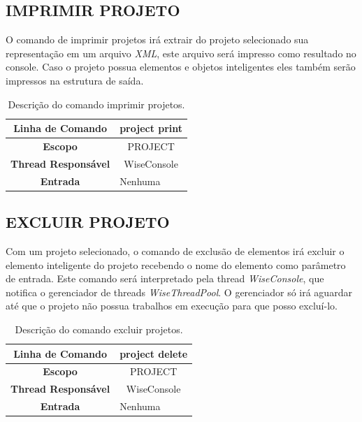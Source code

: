 \subsection{IMPRIMIR PROJETO}\label{sec:print_projects}

O comando de imprimir projetos irá extrair do projeto selecionado sua representação em um arquivo \textit{XML}, este arquivo será impresso como resultado no console. Caso o projeto possua elementos e objetos inteligentes eles também serão impressos na estrutura de saída.

\begin{center}
	\begin{table}[!htbp]
		\begin{tabular}{|c|m{}|}
			\hline
			\textbf{Linha de Comando} & \multicolumn{1}{c|}{project print} \\
			\hline
			\textbf{Escopo} & \multicolumn{1}{c|}{PROJECT} \\
			\hline
			\textbf{Thread Responsável} & \multicolumn{1}{c|}{WiseConsole} \\
			\hline
			\textbf{Entrada} & Nenhuma \\
			\hline
		\end{tabular}
		\caption{Descrição do comando imprimir projetos.}
		\label{tab:print_projects}
	\end{table}
\end{center}

\subsection{EXCLUIR PROJETO}\label{sec:delete_projects}

Com um projeto selecionado, o comando de exclusão de elementos irá excluir o elemento inteligente do projeto recebendo o nome do elemento como parâmetro de entrada. Este comando será interpretado pela thread \textit{WiseConsole}, que notifica o gerenciador de threads \textit{WiseThreadPool}. O gerenciador só irá aguardar até que o projeto não possua trabalhos em execução para que posso excluí-lo.

\begin{center}
	\begin{table}[!htbp]
		\begin{tabular}{|c|m{}|}
			\hline
			\textbf{Linha de Comando} & \multicolumn{1}{c|}{project delete} \\
			\hline
			\textbf{Escopo} & \multicolumn{1}{c|}{PROJECT} \\
			\hline
			\textbf{Thread Responsável} & \multicolumn{1}{c|}{WiseConsole} \\
			\hline
			\textbf{Entrada} & Nenhuma \\
			\hline
		\end{tabular}
		\caption{Descrição do comando excluir projetos.}
		\label{tab:delete_projects}
	\end{table}
\end{center}

